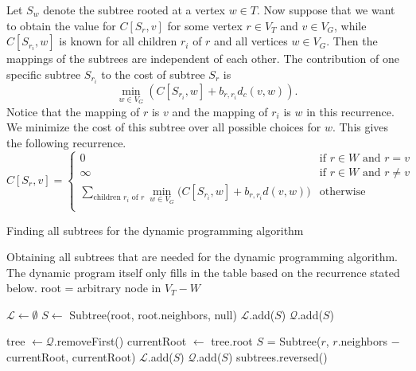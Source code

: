 Let $S_w$ denote the subtree rooted at a vertex $w \in T$.
Now suppose that we want to obtain the value for $C[S_r, v]$ for some vertex $r \in V_T$ and $v \in V_G$, while $C[S_{r_i}, w]$ is known for all children $r_i$ of $r$ and all vertices $w \in V_G$.
Then the mappings of the subtrees are independent of each other.
The contribution of one specific subtree $S_{r_i}$ to the cost of subtree $S_r$ is
\[
    \min_{w \in V_G} \left( C[S_{r_i}, w] + b_{r, r_i} d_c(v, w) \right).
\]
Notice that the mapping of $r$ is $v$ and the mapping of $r_i$ is $w$ in this recurrence.
We minimize the cost of this subtree over all possible choices for $w$.
This gives the following recurrence.
\[
    C[S_r, v] = \begin{cases}
                  0 &\text{if $r \in W$ and $r = v$} \\
                  \infty &\text{if $r \in W$ and $r \neq v$} \\
                  \displaystyle \sum_{\text{children $r_i$ of $r$}} \min_{w \in V_G} \Big( C[S_{r_i}, w] + b_{r, r_i} d(v, w) \Big) &\text{otherwise} \\
    \end{cases}
\]

\begin{algorithm}
    \caption{Finding all subtrees for the dynamic programming algorithm}
    \label{alg:subtrees}
    \begin{algorithmic}[1]
        \Statex Obtaining all subtrees that are needed for the dynamic programming algorithm.
        The dynamic program itself only fills in the table based on the recurrence stated below.
            \State root = arbitrary node in $V_T - W$

            \State $\mathcal L \gets \emptyset$
            \State $S \gets$ Subtree(root, root.neighbors, null) 
            \State $\mathcal L$.add($S$)
            \State $\mathcal Q$.add($S$)

                \State tree $\gets \mathcal Q$.removeFirst()
                \State currentRoot $\gets$ tree.root
                    \State $S$ = Subtree($r$, $r$.neighbors $-$ currentRoot, currentRoot)
                    \State $\mathcal L$.add($S$)
                    \State $\mathcal Q$.add($S$)
                \EndFor
            \EndWhile
            \State \Return subtrees.reversed()
        \EndProcedure
    \end{algorithmic}
\end{algorithm}


